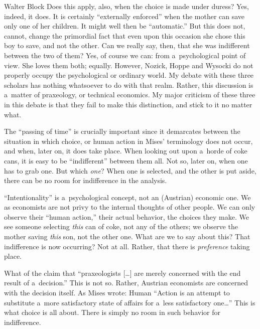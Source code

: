 \begin{artengenv}{Walter Block}
Does this apply, also, when the choice is made under duress? Yes, indeed, it does. It is certainly ``externally enforced'' when the mother can save only one of her children. It might well then be ``automatic.'' But this does not, cannot, change the primordial fact that even upon this occasion she chose this boy to save, and not the other. Can we really say, then, that she was indifferent between the two of them? Yes, of course we can: from a~psychological point of view. She loves them both; equally. However, Nozick, Hoppe and Wysocki do not properly occupy the psychological or ordinary world. My debate with these three scholars has nothing whatsoever to do with that realm. Rather, this discussion is a~matter of praxeology, or technical economics. My major criticism of these three in this debate is that they fail to make this distinction, and stick to it no matter what.

The ``passing of time'' is crucially important since it demarcates between the situation in which choice, or human action in Mises' terminology does not occur, and when, later on, it does take place. When looking out upon a~horde of coke cans, it is easy to be ``indifferent'' between them all. Not so, later on, when one has to grab one. But which \textit{one}? When one is selected, and the other is put aside, there can be no room for indifference in the analysis.

``Intentionality'' is a~psychological concept, not an (Austrian) economic one. We as economists are not privy to the internal thoughts of other people. We can only observe their ``human action,'' their actual behavior, the choices they make. We see someone selecting \textit{this} can of coke, not any of the others; we observe the mother saving \textit{this} son, not the other one. What are we to say about this? That indifference is now occurring? Not at all. Rather, that there is \textit{preference} taking place.

What of the claim that ``praxeologists [\ldots] are merely concerned with the end result of a~decision.'' This is not so. Rather, Austrian economists are concerned with the decision itself. As Mises
\parencite*[][p.97]{mises_human_1998} %
 wrote: Human ``Action is an attempt to substitute a~more satisfactory state of affairs for a~less satisfactory one…'' This is what choice is all about. There is simply no room in such behavior for indifference.

\end{artengenv}
